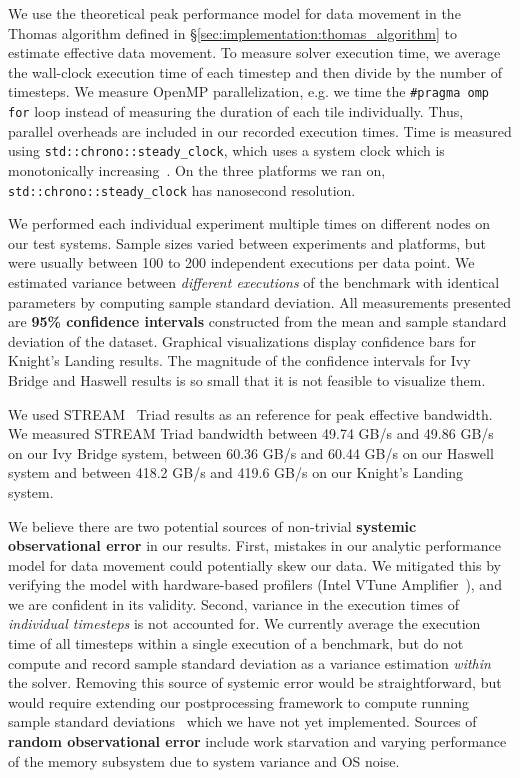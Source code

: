 \documentclass{sig-alternate-05-2015}
\begin{document}
We use the theoretical peak performance model for data movement in the Thomas
  algorithm defined in \S\ref{sec:implementation:thomas_algorithm} to estimate
  effective data movement.
To measure solver execution time, we average the wall-clock execution time of
  each timestep and then divide by the number of timesteps.
We measure OpenMP parallelization, e.g. we time the \lstinline{#pragma omp for}
  loop instead of measuring the duration of each tile individually.
Thus, parallel overheads are included in our recorded execution times.
Time is measured using \lstinline{std::chrono::steady_clock}, which uses a
  system clock which is monotonically increasing~\cite{cppreference_chrono_steady_clock}.
On the three platforms we ran on, \lstinline{std::chrono::steady_clock} has
  nanosecond resolution.

We performed each individual experiment multiple times on different nodes on
  our test systems.
Sample sizes varied between experiments and platforms, but were usually between
  100 to 200 independent executions per data point.
We estimated variance between \emph{different
  executions} of the benchmark with identical parameters by computing sample
  standard deviation.
All measurements presented are \textbf{95\% confidence intervals} constructed
  from the mean and sample standard deviation of the dataset.
Graphical visualizations display confidence bars for Knight's Landing results.
The magnitude of the confidence intervals for Ivy Bridge and Haswell results is
  so small that it is not feasible to visualize them.~\cite{benchmarking_cpp_code}

We used STREAM~\cite{stream} Triad results as an reference for peak effective
  bandwidth.
We measured STREAM Triad bandwidth between 49.74 GB/s and 49.86 GB/s on our Ivy
  Bridge system, between 60.36 GB/s and 60.44 GB/s on our Haswell system and
  between 418.2 GB/s and 419.6 GB/s on our Knight's Landing system.

We believe there are two potential sources of non-trivial \textbf{systemic
  observational error} in our results.
First, mistakes in our analytic performance model for data movement could potentially
  skew our data.
We mitigated this by verifying the model with hardware-based
  profilers (Intel VTune Amplifier~\cite{intel_vtune_amplifier}), and we are confident
  in its validity.
Second, variance in the execution times of \emph{individual timesteps} is not
  accounted for.
We currently average the execution time of all timesteps
  within a single execution of a benchmark, but do not compute and record
  sample standard deviation as a variance estimation \emph{within} the solver.
Removing this source of systemic error would be straightforward, but
  would require extending our postprocessing framework to compute running 
  sample standard deviations~\cite{benchmarking_cpp_code} which we have not
  yet implemented.
Sources of \textbf{random observational error} include work starvation and
  varying performance of the memory subsystem due to system variance and OS
  noise.
\end{document}
